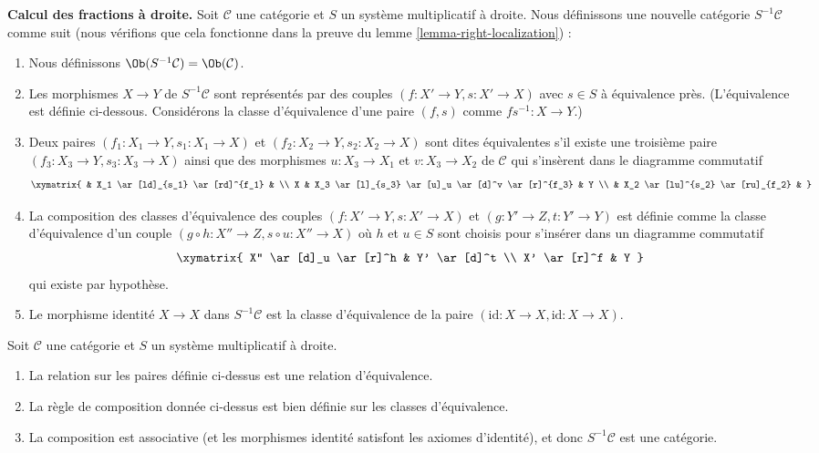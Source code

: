 \noindent
{\bf Calcul des fractions à droite.} Soit $\mathcal{C}$ une catégorie et $S$ un
système multiplicatif à droite. Nous définissons une nouvelle catégorie
$S^{-1}\mathcal{C}$ comme suit (nous vérifions que cela fonctionne dans la
preuve du lemme \ref{lemma-right-localization}) :
\begin{enumerate}
\item Nous définissons $\Ob(S^{-1}\mathcal{C}) = \Ob(\mathcal{C})$.
\item Les morphismes $X \to Y$ de $S^{-1}\mathcal{C}$ sont représentés par des couples
$(f : X' \to Y, s : X' \to X)$ avec $s \in S$ à équivalence près.
(L'équivalence est définie ci-dessous. Considérons la classe d'équivalence d'une
paire $(f, s)$ comme $fs^{-1} : X \to Y$.)
\item Deux paires $(f_1 : X_1 \to Y, s_1 : X_1 \to X)$ et $(f_2 : X_2 \to Y, s_2 : X_2 \to X)$ sont dites équivalentes s'il existe une troisième paire
$(f_3 : X_3 \to Y, s_3 : X_3 \to X)$ ainsi que des morphismes $u : X_3 \to X_1$ et $v : X_3 \to X_2$ de $\mathcal{C}$ qui s'insèrent dans le diagramme commutatif
$$
\xymatrix{
 & X_1 \ar[ld]_{s_1} \ar[rd]^{f_1} & \\
X &
X_3 \ar[l]_{s_3} \ar[u]_u \ar[d]^v \ar[r]^{f_3} &
Y \\
& X_2 \ar[lu]^{s_2} \ar[ru]_{f_2} &
}
$$
\item La composition des classes d'équivalence des couples $(f : X' \to Y, s : X' \to X)$ et $(g : Y' \to Z, t : Y' \to Y)$ est définie comme la classe
d'équivalence d'un couple $(g \circ h : X'' \to Z, s \circ u : X'' \to X)$ où
$h$ et $u \in S$ sont choisis pour s'insérer dans un diagramme commutatif
$$
\xymatrix{
X'' \ar[d]_u \ar[r]^h & Y' \ar[d]^t \\
X' \ar[r]^f & Y
}
$$
qui existe par hypothèse.
\item Le morphisme identité $X \to X$ dans $S^{-1} \mathcal{C}$ est la
classe d'équivalence de la paire $(\text{id} : X \to X,
\text{id} : X \to X)$.
\end{enumerate}

\begin{lemma}
\label{lemma-right-localization}
Soit $\mathcal{C}$ une catégorie et $S$ un système multiplicatif à droite.
\begin{enumerate}
\item La relation sur les paires définie ci-dessus est une relation d'équivalence.
\item La règle de composition donnée ci-dessus est bien définie sur les
classes d'équivalence.
\item La composition est associative (et les morphismes identité satisfont
les axiomes d'identité), et donc $S^{-1}\mathcal{C}$ est une catégorie.
\end{enumerate}
\end{lemma}

